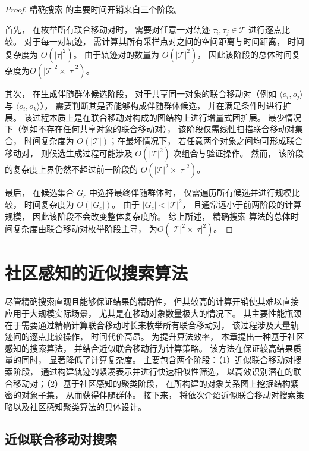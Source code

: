     \begin{proof}
    精确搜索 的主要时间开销来自三个阶段。

    首先， 在枚举所有联合移动对时， 需要对任意一对轨迹 $\tau_i,\tau_j \in \mathcal{T}$ 进行逐点比较。 对于每一对轨迹， 需计算其所有采样点对之间的空间距离与时间距离， 时间复杂度为 $O(|\tau|^2)$。 由于轨迹对的数量为 $O(|\mathcal{T}|^2)$， 因此该阶段的总体时间复杂度为$O(|\mathcal{T}|^2 \times |\tau|^2)$。

    其次， 在生成伴随群体候选阶段， 对于共享同一对象的联合移动对（例如 $\langle o_i,o_j\rangle$ 与 $\langle o_i,o_k\rangle$）， 需要判断其是否能够构成伴随群体候选， 并在满足条件时进行扩展。 该过程本质上是在联合移动对构成的图结构上进行增量式团扩展。 最少情况下（例如不存在任何共享对象的联合移动对）， 该阶段仅需线性扫描联合移动对集合， 时间复杂度为 $O(|\mathcal{T}|)$；在最坏情况下， 若任意两个对象之间均可形成联合移动对， 则候选生成过程可能涉及 $O(|\mathcal{T}|^2)$ 次组合与验证操作。 然而， 该阶段的复杂度上界仍然不超过前一阶段的 $O(|\mathcal{T}|^2 \times |\tau|^2)$。

    最后， 在候选集合 $G_c$ 中选择最终伴随群体时， 仅需遍历所有候选并进行规模比较， 时间复杂度为 $O(|G_c|)$。 由于 $|G_c| < |\mathcal{T}|^2$， 且通常远小于前两阶段的计算规模， 因此该阶段不会改变整体复杂度阶。
    综上所述， 精确搜索 算法的总体时间复杂度由联合移动对枚举阶段主导， 为$O(|\mathcal{T}|^2 \times |\tau|^2)$。
    \end{proof}


\section{社区感知的近似搜索算法}
\label{cm_sec:approximate}

尽管精确搜索直观且能够保证结果的精确性， 但其较高的计算开销使其难以直接应用于大规模实际场景， 尤其是在移动对象数量极大的情况下。 其主要性能瓶颈在于需要通过精确计算联合移动时长来枚举所有联合移动对， 该过程涉及大量轨迹间的逐点比较操作， 时间代价高昂。 为提升算法效率， 本章提出一种基于社区感知的搜索算法， 并结合近似联合移动行为计算策略。 该方法在保证较高结果质量的同时， 显著降低了计算复杂度。 主要包含两个阶段：（1）近似联合移动对搜索阶段， 通过构建轨迹的紧凑表示并进行快速相似性筛选， 以高效识别潜在的联合移动对；（2）基于社区感知的聚类阶段， 在所构建的对象关系图上挖掘结构紧密的对象子集， 从而获得伴随群体。 接下来， 将依次介绍近似联合移动对搜索策略以及社区感知聚类算法的具体设计。

\subsection{近似联合移动对搜索}

